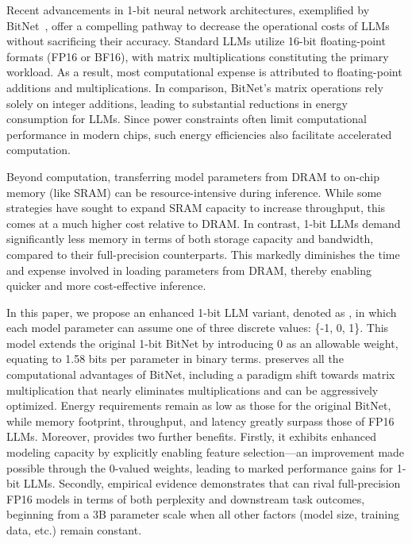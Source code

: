 Recent advancements in 1-bit neural network architectures, exemplified by BitNet~\cite{bitnet}, offer a compelling pathway to decrease the operational costs of LLMs without sacrificing their accuracy. Standard LLMs utilize 16-bit floating-point formats (FP16 or BF16), with matrix multiplications constituting the primary workload. As a result, most computational expense is attributed to floating-point additions and multiplications. In comparison, BitNet's matrix operations rely solely on integer additions, leading to substantial reductions in energy consumption for LLMs. Since power constraints often limit computational performance in modern chips, such energy efficiencies also facilitate accelerated computation.

Beyond computation, transferring model parameters from DRAM to on-chip memory (like SRAM) can be resource-intensive during inference. While some strategies have sought to expand SRAM capacity to increase throughput, this comes at a much higher cost relative to DRAM. In contrast, 1-bit LLMs demand significantly less memory in terms of both storage capacity and bandwidth, compared to their full-precision counterparts. This markedly diminishes the time and expense involved in loading parameters from DRAM, thereby enabling quicker and more cost-effective inference.

In this paper, we propose an enhanced 1-bit LLM variant, denoted as \textbf{}, in which each model parameter can assume one of three discrete values: \{-1, 0, 1\}. This model extends the original 1-bit BitNet by introducing 0 as an allowable weight, equating to 1.58 bits per parameter in binary terms.  preserves all the computational advantages of BitNet, including a paradigm shift towards matrix multiplication that nearly eliminates multiplications and can be aggressively optimized. Energy requirements remain as low as those for the original BitNet, while memory footprint, throughput, and latency greatly surpass those of FP16 LLMs. Moreover,  provides two further benefits. Firstly, it exhibits enhanced modeling capacity by explicitly enabling feature selection—an improvement made possible through the 0-valued weights, leading to marked performance gains for 1-bit LLMs. Secondly, empirical evidence demonstrates that  can rival full-precision FP16 models in terms of both perplexity and downstream task outcomes, beginning from a 3B parameter scale when all other factors (model size, training data, etc.) remain constant.

